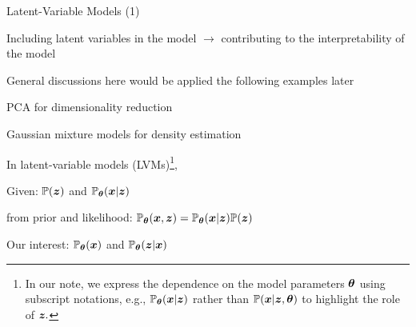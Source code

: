 \documentclass[handout,fleqn,aspectratio=169]{beamer}
\begin{document}
\begin{frame}{Latent-Variable Models (1)}

\plitemsep 0.1in

\bci 

\item Including latent variables in the model $\rightarrow$ contributing to the interpretability of the model

\item General discussions here would be applied the following examples later
\bci
\item PCA for dimensionality reduction \hfill {}
\item Gaussian mixture models for density estimation \hfill {}
\eci


\item In latent-variable models (LVMs)\footnote{In our note, we express the dependence on the model parameters $\bm{\theta}$ using subscript notations, e.g., $\mathbb{P}_{\bm{\theta}}( \bm{x} | \bm{z} )$ rather than $\mathbb{P}( \bm{x}| \bm{z}, \bm{\theta} )$ to highlight the role of $\bm{z}.$ }, 
\bci
\item Given:  $\mathbb{P}( \bm{z} )$ and  $\mathbb{P}_{\bm{\theta}}( \bm{x} | \bm{z} )$
\item {} from prior and likelihood: $\mathbb{P}_{\bm{\theta}}( \bm{x},\bm{z} ) = \mathbb{P}_{\bm{\theta}}( \bm{x} | \bm{z} ) \mathbb{P}( \bm{z} )$
\item Our interest:  $\mathbb{P}_{\bm{\theta}}( \bm{x} )$ 
and  $\mathbb{P}_{\bm{\theta}}( \bm{z}|\bm{x} )$
\eci




\eci
\end{frame}
\end{document}
